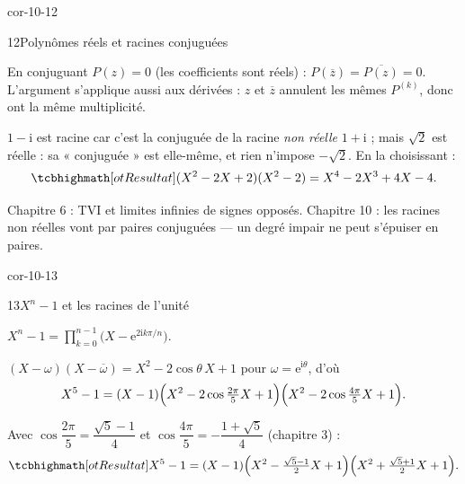 \begin{blocLivre}{cor-10-12}
\begin{corrige}{12}{Polynômes réels et racines conjuguées}
\begin{questions}
  \item En conjuguant $P(z)=0$ (les coefficients sont réels) :
    $P(\overline{z})=\overline{P(z)}=0$. L'argument s'applique aussi aux
    dérivées : $z$ et $\overline{z}$ annulent les mêmes
    $P^{(k)}$, donc ont la même multiplicité.
  \item $1-\mathrm{i}$ est racine car c'est la conjuguée de la racine
    \emph{non réelle} $1+\mathrm{i}$ ; mais $\sqrt2$ est réelle : sa
    « conjuguée » est elle-même, et rien n'impose $-\sqrt2$. En la
    choisissant :
    \[
      \res{(X^{2}-2X+2)(X^{2}-2)=X^{4}-2X^{3}+4X-4}.
    \]
  \item Chapitre 6 : TVI et limites infinies de signes opposés.
    Chapitre 10 : les racines non réelles vont par paires conjuguées — un
    degré impair ne peut s'épuiser en paires.
\end{questions}
\end{corrige}
\end{blocLivre}

\begin{blocLivre}{cor-10-13}
\begin{corrige}{13}{$X^{n}-1$ et les racines de l'unité}
\begin{questions}
  \item $X^{n}-1=\displaystyle\prod_{k=0}^{n-1}\bigl(X-\mathrm{e}^{2\mathrm{i}k\pi/n}\bigr)$.
  \item $(X-\omega)(X-\overline{\omega})=X^{2}-2\cos\theta\,X+1$ pour
    $\omega=\mathrm{e}^{\mathrm{i}\theta}$, d'où
    \[
      X^{5}-1=(X-1)\Bigl(X^{2}-2\cos\tfrac{2\pi}{5}X+1\Bigr)
      \Bigl(X^{2}-2\cos\tfrac{4\pi}{5}X+1\Bigr).
    \]
  \item Avec $\cos\dfrac{2\pi}{5}=\dfrac{\sqrt5-1}{4}$ et
    $\cos\dfrac{4\pi}{5}=-\dfrac{1+\sqrt5}{4}$ (chapitre 3) :
    \[
      \res{X^{5}-1=(X-1)
      \Bigl(X^{2}-\tfrac{\sqrt5-1}{2}X+1\Bigr)
      \Bigl(X^{2}+\tfrac{\sqrt5+1}{2}X+1\Bigr)}.
    \]
\end{questions}
\end{corrige}
\end{blocLivre}

